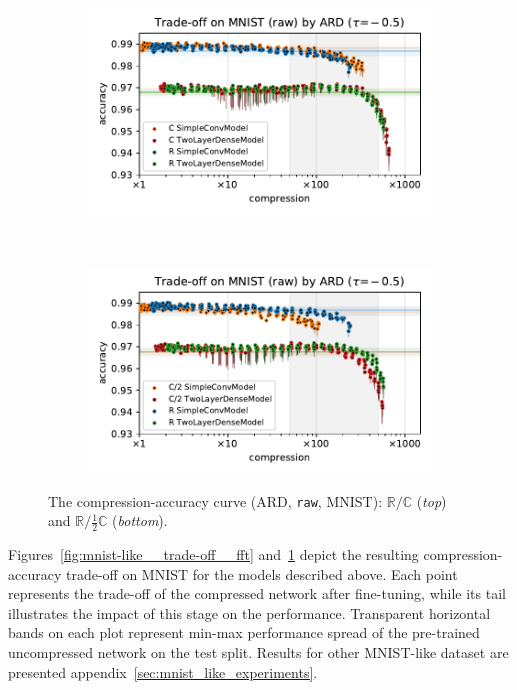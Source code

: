 \documentclass[a4paper,10pt,twocolumn]{article}
\newcommand{\real}{\mathbb{R}}
\newcommand{\cplx}{\mathbb{C}}
\begin{document}
\begin{figure}[!t]
  \centering
  \begin{subfigure}[b]{1.\columnwidth}  %
    \centering
    \includegraphics[width=\columnwidth]{figure__mnist-like__trade-off/appendix__ARD__mnist__raw__-0.5.pdf}
  \end{subfigure} \\%
  \begin{subfigure}[b]{1.\columnwidth}  %
    \centering
    \includegraphics[width=\columnwidth]{figure__mnist-like__trade-off/appendix__cmp__ARD__mnist__raw__-0.5.pdf}
  \end{subfigure}
  \caption{%
    The compression-accuracy curve (ARD, \texttt{raw}, MNIST):
    $\real / \cplx$ (\textit{top}) and $\real / \tfrac12 \cplx$ (\textit{bottom}).
  }
  \label{fig:mnist-like__trade-off__raw}
\end{figure}

Figures~\ref{fig:mnist-like__trade-off__fft} and~\ref{fig:mnist-like__trade-off__raw}
depict the resulting compression-accuracy trade-off on MNIST for the models described
above.
%
Each point represents the trade-off of the compressed network after fine-tuning, while
its tail illustrates the impact of this stage on the performance. Transparent horizontal
bands on each plot represent min-max performance spread of the pre-trained uncompressed
network on the test split.
%
Results for other MNIST-like dataset are presented appendix~\ref{sec:mnist_like_experiments}.
\end{document}
